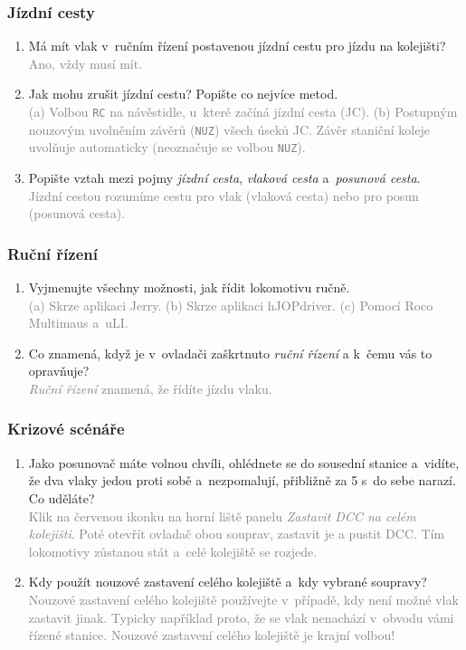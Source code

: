\documentclass[12pt,a4paper]{article}
\newcommand{\solution}[1]{\\ \textcolor{gray}{#1}}
\newcommand{\solution}[1]{}
\begin{document}
\subsubsection*{Jízdní cesty}
\begin{enumerate}[leftmargin=*]
\item Má mít vlak v~ručním řízení postavenou jízdní cestu pro jízdu na
kolejišti?
\solution{Ano, vždy musí mít.}

\item Jak mohu zrušit jízdní cestu? Popište co nejvíce metod.
\solution{(a) Volbou \texttt{RC} na návěstidle, u~které začíná jízdní cesta
(JC). (b) Postupným nouzovým uvolněním závěrů (\texttt{NUZ}) všech úseků JC.
Závěr staniční koleje uvolňuje automaticky (neoznačuje se volbou \texttt{NUZ}).}

\item Popište vztah mezi pojmy \textit{jízdní cesta}, \textit{vlaková cesta}
a~\textit{posunová cesta}.
\solution{Jízdní cestou rozumíme cestu pro vlak (vlaková cesta) nebo pro posun
(posunová cesta).}

\end{enumerate}

\subsubsection*{Ruční řízení}
\begin{enumerate}[leftmargin=*]
\item Vyjmenujte všechny možnosti, jak řídit lokomotivu ručně.
\solution{(a) Skrze aplikaci Jerry. (b) Skrze aplikaci hJOPdriver. (c) Pomocí
Roco Multimaus a~uLI.}

\item Co znamená, když je v~ovladači zaškrtnuto \textit{ruční řízení}
a k~čemu vás to opravňuje?
\solution{\textit{Ruční řízení} znamená, že řídíte jízdu vlaku.}

\end{enumerate}

\subsubsection*{Krizové scénáře}
\begin{enumerate}[leftmargin=*]
\item Jako posunovač máte volnou chvíli, ohlédnete se do sousední stanice
a~vidíte, že dva vlaky jedou proti sobě a~nezpomalují, přibližně za 5 s~do sebe
narazí. Co uděláte?
\solution{Klik na červenou ikonku na horní liště panelu \textit{Zastavit DCC
na celém kolejišti}. Poté otevřít ovladač obou souprav, zastavit je a pustit
DCC. Tím lokomotivy zůstanou stát a~celé kolejiště se rozjede.}

\item Kdy použít nouzové zastavení celého kolejiště a~kdy vybrané soupravy?
\solution{Nouzové zastavení celého kolejiště používejte v~případě, kdy není
možné vlak zastavit jinak. Typicky například proto, že se vlak nenachází
v~obvodu vámi řízené stanice. Nouzové zastavení celého kolejiště je krajní
volbou!}

\end{enumerate}
\end{document}
